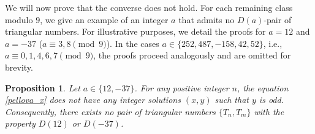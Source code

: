 \documentclass[12pt]{amsart}
\newtheorem{proposition}[theorem]{Proposition}
\theoremstyle{definition}
\begin{document}
We will now prove that the converse does not hold. For each remaining class modulo $9$, we give an example of an integer $a$ that admits no $D(a)$-pair of triangular numbers. For illustrative purposes, we detail the proofs for $a=12$ and $a=-37$ ($a\equiv 3,8\pmod 9$). In the cases $a\in\{252,487,-158,42,52\}$, i.e., $a\equiv 0,1,4,6,7\pmod 9$, the proofs proceed analogously and are omitted for brevity. 

\begin{proposition} \label{prop:nonexist}
Let $a \in \{12, -37\}$. For any positive integer $n$, the equation \eqref{pellova_x}
does not have any integer solutions $(x, y)$ such that $y$ is odd. Consequently, there exists no pair of triangular numbers $\{T_n, T_m\}$ with the property $D(12)$ or $D(-37)$.
\end{proposition}
\end{document}
